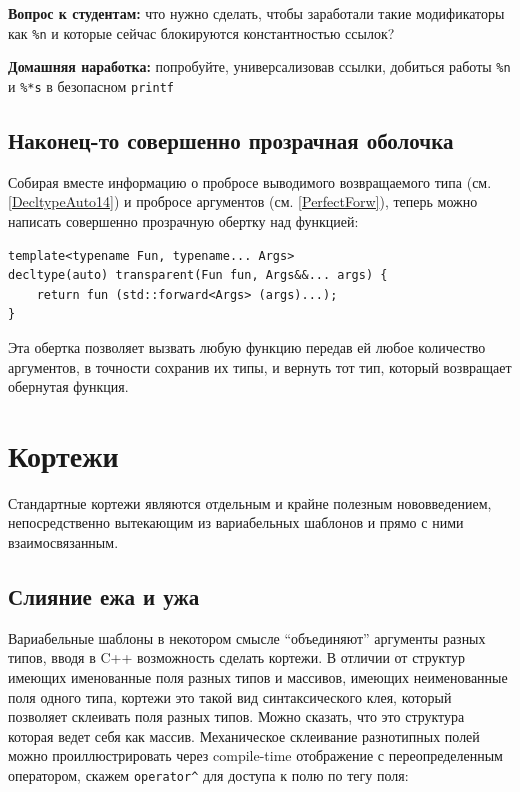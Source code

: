 \documentclass[a4paper,12pt,oneside]{book}
\newif\ifanswers
\begin{document}
\textbf{Вопрос к студентам:} что нужно сделать, чтобы заработали такие модификаторы как \lstinline!%n! и которые сейчас блокируются константностью ссылок?

\ifanswers
Правильный ответ: универсализовать ссылки

\begin{lstlisting}
template<typename T, typename... Args> int
pp_printf(const char* s, T&& value, Args&&... args)
\end{lstlisting}
\fi

\textbf{Домашняя наработка:} попробуйте, универсализовав ссылки, добиться работы \lstinline!%n! и \lstinline!%*s! в безопасном \lstinline!printf!

\subsection{Наконец-то совершенно прозрачная оболочка}\label{PerfectCloth}

Собирая вместе информацию о пробросе выводимого возвращаемого типа (см. \ref{DecltypeAuto14}) и пробросе аргументов (см. \ref{PerfectForw}), теперь можно написать совершенно прозрачную обертку над функцией:

\begin{lstlisting}
template<typename Fun, typename... Args>
decltype(auto) transparent(Fun fun, Args&&... args) { 
    return fun (std::forward<Args> (args)...); 
}
\end{lstlisting}

Эта обертка позволяет вызвать любую функцию передав ей любое количество аргументов, в точности сохранив их типы, и вернуть тот тип, который возвращает обернутая функция.

\pagebreak
\section{Кортежи}

Стандартные кортежи являются отдельным и крайне полезным нововведением, непосредственно вытекающим из вариабельных шаблонов и прямо с ними взаимосвязанным.

\subsection{Слияние ежа и ужа}

Вариабельные шаблоны в некотором смысле ``объединяют'' аргументы разных типов, вводя в C++ возможность сделать кортежи. В отличии от структур имеющих именованные поля разных типов и массивов, имеющих неименованные поля одного типа, кортежи это такой вид синтаксического клея, который позволяет склеивать поля разных типов. Можно сказать, что это структура которая ведет себя как массив. Механическое склеивание разнотипных полей можно проиллюстрировать через compile-time отображение с переопределенным оператором, скажем \lstinline!operator^! для доступа к полю по тегу поля:
\end{document}
